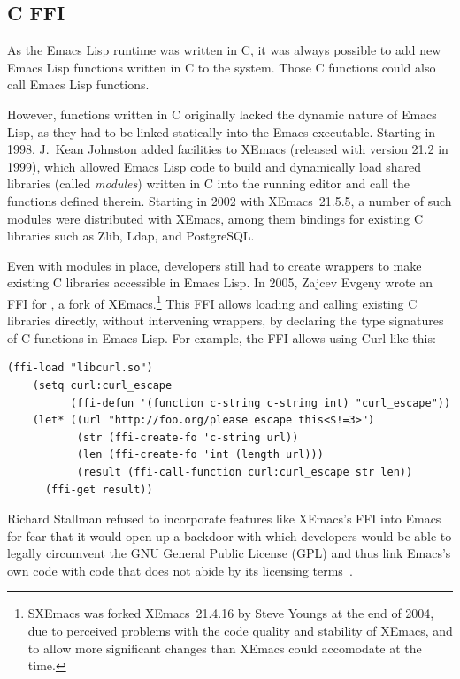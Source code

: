 \documentclass[format=acmsmall,screen]{acmart}
\newcommand \Elisp {Emacs Lisp}
\begin{document}
\subsection{C FFI}

As the \Elisp{} runtime was written in C, it was always possible to
add new \Elisp{} functions written in C to the system.  Those C
functions could also call \Elisp{} functions.

However, functions written in C originally lacked the dynamic nature
of \Elisp{}, as they had to be linked statically into the Emacs executable.
Starting in 1998, J.\ Kean Johnston added facilities to XEmacs
(released with version 21.2 in 1999), which allowed \Elisp{} code to
build and dynamically load shared libraries (called \textit{modules})
written in C into the running editor and call the functions defined
therein.  Starting in 2002 with XEmacs~21.5.5, a number of such modules
were distributed with XEmacs, among them bindings for existing C
libraries such as Zlib, Ldap, and PostgreSQL.

Even with modules in place, developers still had to create wrappers to
make existing C libraries accessible in \Elisp{}.  In 2005, Zajcev
Evgeny wrote an FFI for \citet{SXEmacs}, a fork of
XEmacs.\footnote{SXEmacs was forked XEmacs~21.4.16 by Steve Youngs at
  the end of 2004, due to perceived problems with the code quality and
stability of XEmacs, and to allow more significant changes than XEmacs
could accomodate at the time.}
This FFI allows loading and calling existing C libraries directly,
without intervening wrappers, by declaring the type signatures of C
functions in \Elisp{}.  For example, the FFI allows using Curl like
this:
\begin{Verbatim}[samepage=true]
    (ffi-load "libcurl.so")
    (setq curl:curl_escape
          (ffi-defun '(function c-string c-string int) "curl_escape"))
    (let* ((url "http://foo.org/please escape this<$!=3>")
           (str (ffi-create-fo 'c-string url))
           (len (ffi-create-fo 'int (length url)))
           (result (ffi-call-function curl:curl_escape str len))
      (ffi-get result))
\end{Verbatim}
Richard Stallman refused to incorporate features like XEmacs's FFI into Emacs for fear
that it would open up a backdoor with which developers would be able to
legally circumvent the GNU General Public License (GPL) and thus link
Emacs's own code with code that does not abide by its licensing terms~\cite{RMS03}.
\end{document}
